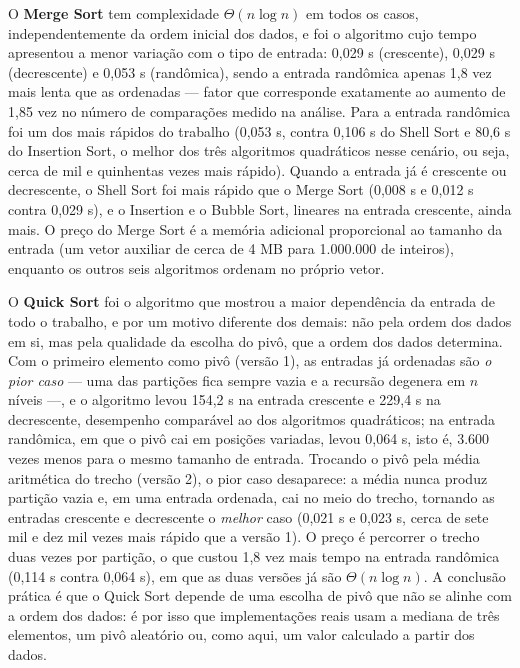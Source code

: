 \qquad O \textbf{Merge Sort} tem complexidade $\Theta(n \log n)$ em todos os
casos, independentemente da ordem inicial dos dados, e foi o
algoritmo cujo tempo apresentou a menor variação com o tipo de
entrada: 0,029 s (crescente), 0,029 s (decrescente) e 0,053 s
(randômica), sendo a entrada randômica apenas 1,8 vez mais lenta que
as ordenadas --- fator que corresponde exatamente ao aumento de 1,85
vez no número de comparações medido na análise. Para a entrada
randômica foi um dos mais rápidos do trabalho (0,053 s, contra 0,106 s
do Shell Sort e 80,6 s do Insertion Sort, o melhor dos três algoritmos
quadráticos nesse cenário, ou seja, cerca de mil e quinhentas vezes
mais rápido). Quando a entrada já é crescente ou decrescente, o Shell
Sort foi mais rápido que o Merge Sort (0,008 s e 0,012 s contra
0,029 s), e o Insertion e o Bubble Sort, lineares na entrada
crescente, ainda mais. O preço do Merge Sort é a memória adicional
proporcional ao tamanho da entrada (um vetor auxiliar de cerca de
4 MB para 1.000.000 de inteiros), enquanto os outros seis algoritmos
ordenam no próprio vetor.

\qquad O \textbf{Quick Sort} foi o algoritmo que mostrou a maior
dependência da entrada de todo o trabalho, e por um motivo diferente
dos demais: não pela ordem dos dados em si, mas pela qualidade da
escolha do pivô, que a ordem dos dados determina. Com o primeiro
elemento como pivô (versão 1), as entradas já ordenadas são
\textit{o pior caso} --- uma das partições fica sempre vazia e a
recursão degenera em $n$ níveis ---, e o algoritmo levou 154,2 s na
entrada crescente e 229,4 s na decrescente, desempenho comparável ao
dos algoritmos quadráticos; na entrada randômica, em que o pivô cai em
posições variadas, levou 0,064 s, isto é, 3.600 vezes menos para o
mesmo tamanho de entrada. Trocando o pivô pela média aritmética do
trecho (versão 2), o pior caso desaparece: a média nunca produz
partição vazia e, em uma entrada ordenada, cai no meio do trecho,
tornando as entradas crescente e decrescente o \textit{melhor} caso
(0,021 s e 0,023 s, cerca de sete mil e dez mil vezes mais rápido que
a versão 1). O preço é percorrer o trecho duas vezes por partição,
o que custou 1,8 vez mais tempo na entrada randômica (0,114 s contra
0,064 s), em que as duas versões já são $\Theta(n \log n)$. A
conclusão prática é que o Quick Sort depende de uma escolha de pivô
que não se alinhe com a ordem dos dados: é por isso que
implementações reais usam a mediana de três elementos, um pivô
aleatório ou, como aqui, um valor calculado a partir dos dados.

